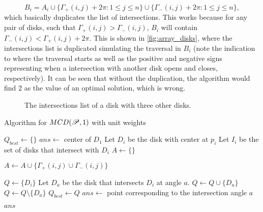 \begin{equation}
B_i = A_i \cup \{\Gamma_+(i,j) + 2\pi : 1 \le j \le n\} \cup \{\Gamma_-(i,j) + 2\pi: 1 \le j \le n\},
\end{equation}
which basically duplicates the list of intersections. This works because for any pair of disks, such that $\Gamma_+(i,j) > \Gamma_-(i,j)$, $B_i$ will contain $\Gamma_-(i,j) < \Gamma_+(i,j) + 2\pi$. This is shown in \autoref{fig:array_disks}, where the intersections list is duplicated simulating the traversal in $B_i$ (note the indication to where the traversal starts as well as the positive and negative signs representing when a intersection with another disk opens and closes, respectively). It can be seen that without the duplication, the algorithm would find $2$ as the value of an optimal solution, which is wrong.

\begin{figure}[H]
    \centering
    
    \caption{The intersections list of a disk with three other disks.}
    
    \fautor
    \label{fig:array_disks}
\end{figure}

\begin{algoritmo}
\caption{Algorithm for $MCD(\mathscr{P}, 1)$ with unit weights}\label{algoritmo:mcd_1}
\begin{algorithmic}[1]

\item[]

\State $Q_{best} \gets \{\}$
\State $ans \gets$ center of $D_1$
\State Let $D_i$ be the disk with center at $p_i$
\State Let $I_i$ be the set of disks that intersect with $D_i$
\State $A \gets \{\}$ 

\State $A \gets A \cup \{\Gamma_+(i,j) \cup \Gamma_-(i,j)\}$
\EndFor

\State $Q \gets \{D_i\}$ 
 
\State Let $D_a$ be the disk that intersects $D_i$ at angle $a$. 
\State $Q \gets Q \cup \{D_a\}$
\Else
\State $Q \gets Q \setminus \{D_a\}$
\EndIf
{}
\State $Q_{best} \gets Q$
\State $ans \gets $ point corresponding to the intersection angle $a$
\EndIf
\EndFor
\EndFor
\EndFor

\State \Return $ans$
\EndProcedure
\end{algorithmic}
\end{algoritmo}

